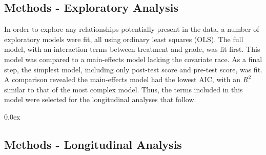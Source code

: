 \documentclass[a0,landscape]{a0poster}
\begin{document}
\begin{multicols}{3}
\subsection*{Methods - Exploratory Analysis}

In order to explore any relationships potentially present
in the data, a number of exploratory models were fit,
all using ordinary least squares (OLS).
The full model, with an interaction terms between treatment and grade,
was fit first.
This model was compared to a main-effects model
lacking the covariate race.
As a final step, the simplest model, including only
post-test score and pre-test score, was fit.
A comparison revealed the main-effects model had the lowest AIC,
with an $R^{2}$ similar to that of the most complex model.
Thus, the terms included in this model were selected for the
longitudinal analyses that follow.

\parskip 0.0ex
\subsection*{Methods - Longitudinal Analysis}


\end{multicols}
\end{document}
